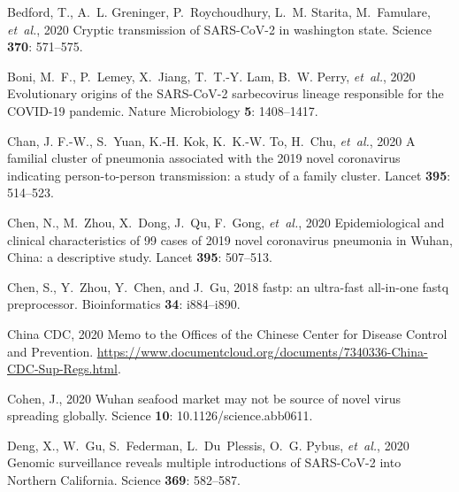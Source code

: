 \documentclass[9pt,twocolumn,twoside]{gsajnl_modified}
\begin{document}
\begin{thebibliography}{47}

{Bedford, T., A.~L. Greninger, P.~Roychoudhury, L.~M. Starita, M.~Famulare,
  {\em et~al.\/}}, 2020 Cryptic transmission of {SARS-CoV-2} in washington
  state. Science {\bf 370}: 571--575.

{Boni, M.~F., P.~Lemey, X.~Jiang, T.~T.-Y. Lam, B.~W. Perry, {\em et~al.\/}},
  2020 {Evolutionary origins of the SARS-CoV-2 sarbecovirus lineage responsible
  for the COVID-19 pandemic}. Nature Microbiology {\bf 5}: 1408--1417.

{Chan, J. F.-W., S.~Yuan, K.-H. Kok, K.~K.-W. To, H.~Chu, {\em et~al.\/}}, 2020
  A familial cluster of pneumonia associated with the 2019 novel coronavirus
  indicating person-to-person transmission: a study of a family cluster. Lancet
  {\bf 395}: 514--523.

{Chen, N., M.~Zhou, X.~Dong, J.~Qu, F.~Gong, {\em et~al.\/}}, 2020
  Epidemiological and clinical characteristics of 99 cases of 2019 novel
  coronavirus pneumonia in {Wuhan, China}: a descriptive study. Lancet {\bf
  395}: 507--513.

{Chen, S., Y.~Zhou, Y.~Chen, {\rm and} J.~Gu}, 2018 fastp: an ultra-fast
  all-in-one fastq preprocessor. Bioinformatics {\bf 34}: i884--i890.

{{China CDC}}, 2020 {Memo to the Offices of the Chinese Center for Disease
  Control and Prevention}.
  \url{https://www.documentcloud.org/documents/7340336-China-CDC-Sup-Regs.html}.

{Cohen, J.}, 2020 Wuhan seafood market may not be source of novel virus
  spreading globally. Science {\bf 10}: 10.1126/science.abb0611.

{Deng, X., W.~Gu, S.~Federman, L.~Du~Plessis, O.~G. Pybus, {\em et~al.\/}},
  2020 Genomic surveillance reveals multiple introductions of {SARS-CoV-2 into
  Northern California}. Science {\bf 369}: 582--587.


\end{thebibliography}
\end{document}
